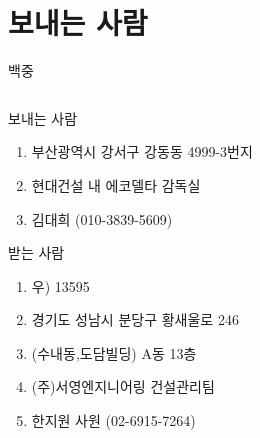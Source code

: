 \documentclass[aspectratio=1610,12pt,xcolor=pdftex,dvipsnames,table,handout]{beamer}
\begin{document}
		\section{보내는 사람}
		\begin{frame}[c,plain]{백중}

		\begin{columns}[t]
		\begin{column}{0.6\textwidth}

			\begin{block} {보내는 사람}
			\begin{enumerate}
			\item [] 부산광역시 강서구 강동동 4999-3번지
			\item [] 현대건설 내 에코델타 감독실
			\item [] 김대희 (010-3839-5609)
			\end{enumerate}
			\end{block}


			\begin{block} {받는 사람}
			\begin{enumerate}
			\item [] 우) 13595
			\item [] 경기도 성남시 분당구 황새울로 246
			\item []  (수내동,도담빌딩) A동 13층
			\item [] (주)서영엔지니어링 건설관리팀
			\item [] 한지원 사원 (02-6915-7264)
			\end{enumerate}
			\end{block}

		\end{column}

		\end{columns}
		\null
		\end{frame}
\end{document}
